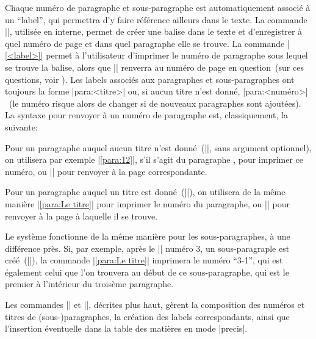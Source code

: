 Chaque numéro de paragraphe et sous-paragraphe est automatiquement associé à un \enquote{label}, qui permettra d'y faire référence ailleurs dans le texte. La commande |\label{<label>}|, utilisée en interne, permet de créer une balise dans le texte et d'enregistrer à quel numéro de page et dans quel paragraphe elle se trouve. La commande |\ref{<label>}| permet à l'utilisateur d'imprimer le numéro de paragraphe sous lequel se trouve la balise, alors que |\pageref{<label>}| renverra au numéro de page en question~(sur ces questions, voir ). Les labels associés aux paragraphes et sous-paragraphes ont toujours la forme |para:<titre>| ou, si aucun titre n'est donné, |para:<numéro>|~(le numéro risque alors de changer si de nouveaux paragraphes sont ajoutées). La syntaxe pour renvoyer à un numéro de paragraphe est, classiquement, la suivante:

Pour un paragraphe auquel aucun titre n'est donné~(|\para|, sans argument optionnel), on utilisera par exemple |\ref{para:12}|, s'il s'agit du paragraphe , pour imprimer ce numéro, ou |\pageref{para:12}| pour renvoyer à la page correspondante.

Pour un paragraphe auquel un titre est donné~(|\para[Le titre]|), on utilisera de la même manière |\ref{para:Le titre}| pour imprimer le numéro du paragraphe, ou |\pageref{para:Le titre}| pour renvoyer à la page à laquelle il se trouve.

Le système fonctionne de la même manière pour les sous-paragraphes, à une différence près. Si, par exemple, après le |\para| numéro 3, un sous-paragraple est créé~(|\subpara[Le titre]|), la commande |\ref{para:Le titre}| imprimera le numéro \enquote{3-1}, qui est également celui que l'on trouvera au début de ce sous-paragraphe, qui est le premier à l'intérieur du troisème paragraphe.

\begin{developer}
Les commandes |\para| et |\subpara|, décrites plus haut, gèrent la composition des numéros et titres de (sous-)paragraphes, la création des labels correspondants, ainsi que l'insertion éventuelle dans la table des matières en mode |precis|.
\end{developer}

